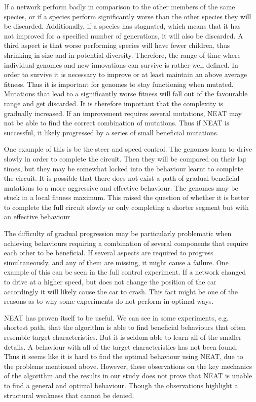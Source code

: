 If a network perform badly in comparison to the other members of the same species, or if a species perform significantly worse than the other species they will be discarded\cite{stanley:neat}. Additionally, if a species has stagnated, which means that it has not improved for a specified number of generations, it will also be discarded. A third aspect is that worse performing species will have fewer children, thus shrinking in size and in potential diversity. Therefore, the range of time where individual genomes and new innovations can survive is rather well defined. In order to survive it is necessary to improve or at least maintain an above average fitness. Thus it is important for genomes to stay functioning when mutated. Mutations that lead to a significantly worse fitness will fall out of the favourable range and get discarded. It is therefore important that the complexity is gradually increased. If an improvement requires several mutations, NEAT may not be able to find the correct combination of mutations. Thus if NEAT is successful, it likely progressed by a series of small beneficial mutations. 

One example of this is be the steer and speed control. The genomes learn to drive slowly in order to complete the circuit. Then they will be compared on their lap times, but they may be somewhat locked into the behaviour learnt to complete the circuit. It is possible that there does not exist a path of gradual beneficial mutations to a more aggressive and effective behaviour. The genomes may be stuck in a local fitness maximum. This raised the question of whether it is better to complete the full circuit slowly or only completing a shorter segment but with an effective behaviour

The difficulty of gradual progression may be particularly problematic when achieving behaviours requiring a combination of several components that require each other to be beneficial. If several aspects are required to progress simultaneously, and any of them are missing, it might cause a failure. One example of this can be seen in the full control experiment. If a network changed to drive at a higher speed, but does not change the position of the car accordingly it will likely cause the car to crash. This fact might be one of the reasons as to why some experiments do not perform in optimal ways.

NEAT has proven itself to be useful. We can see in some experiments, e.g. shortest path, that the algorithm is able to find beneficial behaviours that often resemble target characteristics. But it is seldom able to learn all of the smaller details. A behaviour with all of the target characteristics has not been found. Thus it seems like it is hard to find the optimal behaviour using NEAT, due to the problems mentioned above. However, these observations on the key mechanics of the algorithm and the results in our study does not prove that NEAT is unable to find a general and optimal behaviour. Though the observations highlight a structural weakness that cannot be denied. 

